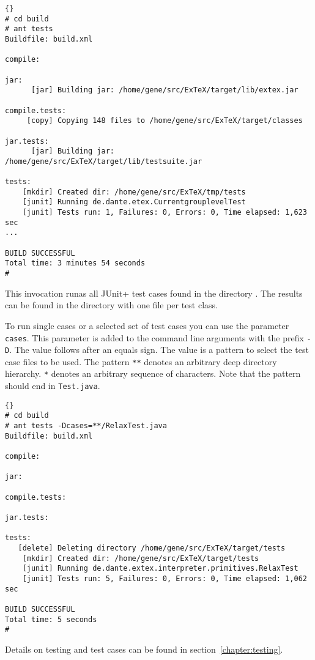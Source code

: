 \begin{lstlisting}{}
# cd build
# ant tests
Buildfile: build.xml

compile:

jar:
      [jar] Building jar: /home/gene/src/ExTeX/target/lib/extex.jar

compile.tests:
     [copy] Copying 148 files to /home/gene/src/ExTeX/target/classes

jar.tests:
      [jar] Building jar: /home/gene/src/ExTeX/target/lib/testsuite.jar

tests:
    [mkdir] Created dir: /home/gene/src/ExTeX/tmp/tests
    [junit] Running de.dante.etex.CurrentgrouplevelTest
    [junit] Tests run: 1, Failures: 0, Errors: 0, Time elapsed: 1,623 sec
...

BUILD SUCCESSFUL
Total time: 3 minutes 54 seconds
#
\end{lstlisting}

This invocation runas all \+JUnit+ test cases found in the directory
. The results can be found in the directory
 with one file per test class.

To run single cases or a selected set of test cases you can use the
parameter \texttt{cases}. This parameter is added to the command line
arguments with the prefix \verb|-D|. The value follows after an equals
sign. The value is a pattern to select the test case files to be used.
The pattern \verb|**| denotes an arbitrary deep directory hierarchy.
\verb|*| denotes an arbitrary sequence of characters. Note that the
pattern should end in \verb|Test.java|.

\begin{lstlisting}{}
# cd build
# ant tests -Dcases=**/RelaxTest.java
Buildfile: build.xml

compile:

jar:

compile.tests:

jar.tests:

tests:
   [delete] Deleting directory /home/gene/src/ExTeX/target/tests
    [mkdir] Created dir: /home/gene/src/ExTeX/target/tests
    [junit] Running de.dante.extex.interpreter.primitives.RelaxTest
    [junit] Tests run: 5, Failures: 0, Errors: 0, Time elapsed: 1,062 sec

BUILD SUCCESSFUL
Total time: 5 seconds
#
\end{lstlisting}

Details on testing and test cases can be found in
section~\ref{chapter:testing}.

